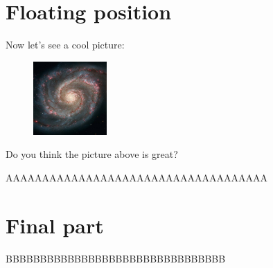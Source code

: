 \documentclass[12pt]{article}
\begin{document}
\section{Floating position}

\blindtext

Now let's see a cool picture:

\begin{figure}
    \includegraphics[max width=0.25\textwidth]{img/universe.jpg}
\end{figure}

Do you think the picture above is great?

\Blindtext[2]

AAAAAAAAAAAAAAAAAAAAAAAAAAAAAAAAAAAA

\blindtext

\section{Final part}

BBBBBBBBBBBBBBBBBBBBBBBBBBBBBBBB
\end{document}
